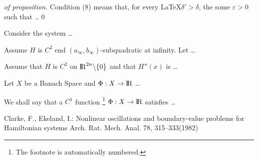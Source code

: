 \documentclass{llncs}
\begin{document}
  
  \begin{proof}[of proposition]
    Condition (8) means that, for every \LaTeX $\delta'>\delta$, the some $\varepsilon>0$ such that \dots \qed
  \end{proof}
  \begin{example}
    Consider the system \dots
  \end{example}
  
  
  \begin{corollary}
    Assume $H$ is $C^{2}$ end
    $\left(a_{\infty}, b_{\infty}\right)$-subquadratic at infinity. Let \dots
  \end{corollary}
  \begin{lemma}
    Assume that $H$ is $C^{2}$ on ${\rm I\!R}^{2n}\backslash \{0\}$ and that $H''(x)$ is \cite{clar:eke}\dots
  \end{lemma}
  \begin{theorem}
    Let $X$ be a Banach Space and $\Phi:X\to{\rm I\!R}$ \dots
  \end{theorem}
  
  \begin{definition}
    We shall say that a $C^{1}$ function \footnote{The footnote is automatically numbered.} $\Phi:X\to{\rm I\!R}$ satisfies \dots
  \end{definition}
  
  \begin{thebibliography}{1}
    Clarke, F., Ekeland, I.:
    Nonlinear oscillations and  boundary-value problems for Hamiltonian systems
    Arch. Rat. Mech. Anal. 78, 315--333(1982)
  \end{thebibliography}
    
  
\end{document}
